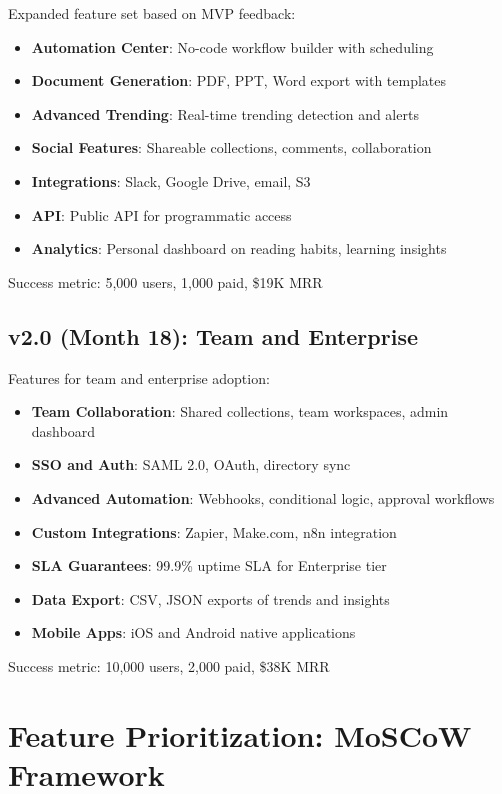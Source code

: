 \documentclass{report}
\begin{document}
Expanded feature set based on MVP feedback:

\begin{itemize}
    \item \textbf{Automation Center}: No-code workflow builder with scheduling
    \item \textbf{Document Generation}: PDF, PPT, Word export with templates
    \item \textbf{Advanced Trending}: Real-time trending detection and alerts
    \item \textbf{Social Features}: Shareable collections, comments, collaboration
    \item \textbf{Integrations}: Slack, Google Drive, email, S3
    \item \textbf{API}: Public API for programmatic access
    \item \textbf{Analytics}: Personal dashboard on reading habits, learning insights
\end{itemize}

Success metric: 5,000 users, 1,000 paid, \$19K MRR

\subsection{v2.0 (Month 18): Team and Enterprise}

Features for team and enterprise adoption:

\begin{itemize}
    \item \textbf{Team Collaboration}: Shared collections, team workspaces, admin dashboard
    \item \textbf{SSO and Auth}: SAML 2.0, OAuth, directory sync
    \item \textbf{Advanced Automation}: Webhooks, conditional logic, approval workflows
    \item \textbf{Custom Integrations}: Zapier, Make.com, n8n integration
    \item \textbf{SLA Guarantees}: 99.9\% uptime SLA for Enterprise tier
    \item \textbf{Data Export}: CSV, JSON exports of trends and insights
    \item \textbf{Mobile Apps}: iOS and Android native applications
\end{itemize}

Success metric: 10,000 users, 2,000 paid, \$38K MRR

\section{Feature Prioritization: MoSCoW Framework}
\end{document}
